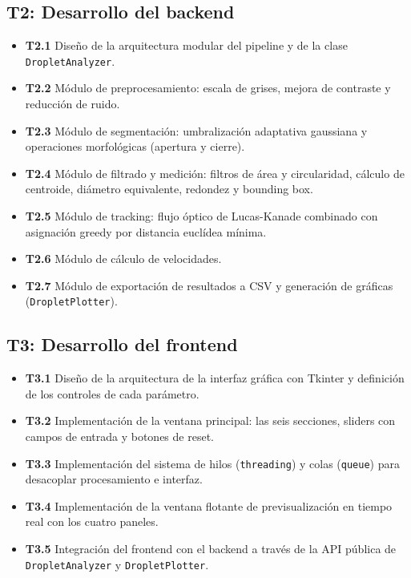 \subsection{T2: Desarrollo del backend}
\begin{itemize}
    \item \textbf{T2.1} Diseño de la arquitectura modular del pipeline y de la clase \texttt{DropletAnalyzer}.
    \item \textbf{T2.2} Módulo de preprocesamiento: escala de grises, mejora de contraste y reducción de ruido.
    \item \textbf{T2.3} Módulo de segmentación: umbralización adaptativa gaussiana y operaciones morfológicas (apertura y cierre).
    \item \textbf{T2.4} Módulo de filtrado y medición: filtros de área y circularidad, cálculo de centroide, diámetro equivalente, redondez y bounding box.
    \item \textbf{T2.5} Módulo de tracking: flujo óptico de Lucas-Kanade combinado con asignación greedy por distancia euclídea mínima.
    \item \textbf{T2.6} Módulo de cálculo de velocidades.
    \item \textbf{T2.7} Módulo de exportación de resultados a CSV y generación de gráficas (\texttt{DropletPlotter}).
\end{itemize}

\subsection{T3: Desarrollo del frontend}
\begin{itemize}
    \item \textbf{T3.1} Diseño de la arquitectura de la interfaz gráfica con Tkinter y definición de los controles de cada parámetro.
    \item \textbf{T3.2} Implementación de la ventana principal: las seis secciones, sliders con campos de entrada y botones de reset.
    \item \textbf{T3.3} Implementación del sistema de hilos (\texttt{threading}) y colas (\texttt{queue}) para desacoplar procesamiento e interfaz.
    \item \textbf{T3.4} Implementación de la ventana flotante de previsualización en tiempo real con los cuatro paneles.
    \item \textbf{T3.5} Integración del frontend con el backend a través de la API pública de \texttt{DropletAnalyzer} y \texttt{DropletPlotter}.
\end{itemize}

